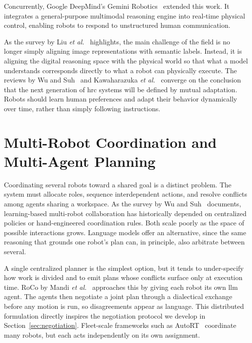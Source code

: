 Concurrently, Google DeepMind’s Gemini Robotics~\cite{google2026} extended this work. It integrates a general-purpose multimodal reasoning engine into real-time physical control, enabling robots to respond to unstructured human communication.

As the survey by Liu \emph{et al.}~\cite{liu2025aligningcyberspacephysical} highlights, the main challenge of the field is no longer simply aligning image representations with semantic labels. Instead, it is aligning the digital reasoning space with the physical world so that what a model understands corresponds directly to what a robot can physically execute. The reviews by Wu and Suh~\cite{wu2024stateoftheartrobotlearningmultirobot} and Kawaharazuka \emph{et al.}~\cite{Kawaharazuka_2024} converge on the conclusion that the next generation of \gls{hrc} systems will be defined by mutual adaptation. Robots should learn human preferences and adapt their behavior dynamically over time, rather than simply following instructions.

\section{Multi-Robot Coordination and Multi-Agent Planning}
Coordinating several robots toward a shared goal is a distinct problem. The system must allocate roles, sequence interdependent actions, and resolve conflicts among agents sharing a workspace. As the survey by Wu and Suh~\cite{wu2024stateoftheartrobotlearningmultirobot} documents, learning-based multi-robot collaboration has historically depended on centralized policies or hand-engineered coordination rules. Both scale poorly as the space of possible interactions grows. Language models offer an alternative, since the same reasoning that grounds one robot’s plan can, in principle, also arbitrate between several.

A single centralized planner is the simplest option, but it tends to under-specify how work is divided and to emit plans whose conflicts surface only at execution time. RoCo by Mandi \emph{et al.}~\cite{mandi2023rocodialecticmultirobotcollaboration} approaches this by giving each robot its own \gls{llm} agent. The agents then negotiate a joint plan through a dialectical exchange before any motion is run, so disagreements appear as language. This distributed formulation directly inspires the negotiation protocol we develop in Section~\ref{sec:negotiation}. Fleet-scale frameworks such as AutoRT~\cite{ahn2024autortembodiedfoundationmodels} coordinate many robots, but each acts independently on its own assignment.

